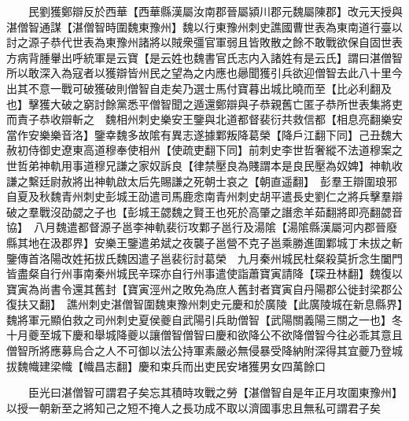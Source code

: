 　　民劉獲鄭辯反於西華【西華縣漢屬汝南郡晉屬潁川郡元魏屬陳郡】改元天授與湛僧智通謀【湛僧智時圍魏東豫州】魏以行東豫州刺史譙國曹世表為東南道行臺以討之源子恭代世表為東豫州諸將以賊衆彊官軍弱且皆敗散之餘不敢戰欲保自固世表方病背腫轝出呼統軍是云寶【是云姓也魏書官氏志内入諸姓有是云氏】謂曰湛僧智所以敢深入為寇者以獲辯皆州民之望為之内應也曏聞獲引兵欲迎僧智去此八十里今出其不意一戰可破獲破則僧智自走矣乃選士馬付寶暮出城比曉而至【比必利翻及也】擊獲大破之窮討餘黨悉平僧智聞之遁還鄭辯與子恭親舊亡匿子恭所世表集將吏而責子恭收辯斬之　魏相州刺史樂安王鑒與北道都督裴衍共救信都【相息亮翻樂安當作安樂樂音洛】鑒幸魏多故隂有異志遂據鄴叛降葛榮【降戶江翻下同】己丑魏大赦初侍御史遼東高道穆奉使相州【使疏吏翻下同】前刺史李世哲奢縱不法道穆案之世哲弟神軌用事道穆兄謙之家奴訴良【律禁壓良為賤謂本是良民壓為奴婢】神軌收謙之繫廷尉赦將出神軌啟太后先賜謙之死朝士哀之【朝直遥翻】　彭羣王辯圍琅邪自夏及秋魏青州刺史彭城王劭遣司馬鹿悆南青州刺史胡平遣長史劉仁之將兵擊羣辯破之羣戰沒劭勰之子也【彭城王勰魏之賢王也死於高肇之譖悆羊茹翻將即亮翻勰音協】　八月魏遣都督源子邕李神軌裴衍攻鄴子邕行及湯隂【湯隂縣漢屬河内郡晉廢縣其地在汲郡界】安樂王鑒遣弟斌之夜襲子邕營不克子邕乘勝進圍鄴城丁未拔之斬鑒傳首洛陽改姓拓拔氏魏因遣子邕裴衍討葛榮　九月秦州城民杜粲殺莫折念生闔門皆盡粲自行州事南秦州城民辛琛亦自行州事遣使詣蕭寶寅請降【琛丑林翻】魏復以寶寅為尚書令還其舊封【寶寅涇州之敗免為庶人舊封者寶寅自丹陽郡公徙封梁郡公復扶又翻】　譙州刺史湛僧智圍魏東豫州刺史元慶和於廣陵【此廣陵城在新息縣界】魏將軍元顯伯救之司州刺史夏侯夔自武陽引兵助僧智【武陽關義陽三關之一也】冬十月夔至城下慶和舉城降夔以讓僧智僧智曰慶和欲降公不欲降僧智今往必乖其意且僧智所將應募烏合之人不可御以法公持軍素嚴必無侵暴受降納附深得其宜夔乃登城拔魏幟建梁幟【幟昌志翻】慶和束兵而出吏民安堵獲男女四萬餘口

　　臣光曰湛僧智可謂君子矣忘其積時攻戰之勞【湛僧智自是年正月攻圍東豫州】以授一朝新至之將知己之短不掩人之長功成不取以濟國事忠且無私可謂君子矣

